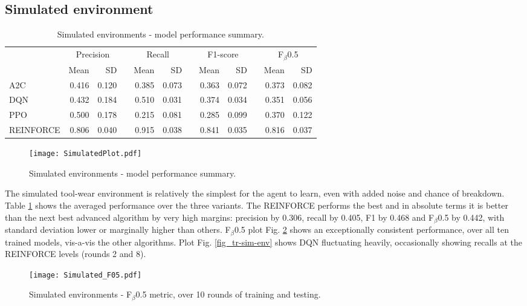 \documentclass[referee, sn-mathphys-num]{sn-jnl}
\newcommand{\rowspace}[1]{\renewcommand{\arraystretch}{#1}}
\begin{document}
	\subsection{Simulated environment}
	\begin{table}
		\rowspace{1.3}
		\caption{Simulated environments - model performance summary.}
		{\begin{tabular}{@{}l rr c rr c rr c rr@{}}
				\arrayrulecolor{black!40}\toprule
				& \multicolumn{2}{c}{Precision} & \phantom{i} & \multicolumn{2}{c}{Recall} & \phantom{i} & \multicolumn{2}{c}{F1-score} & \phantom{i} & \multicolumn{2}{c}{F$_\beta$0.5} \\
				\cmidrule{2-3} \cmidrule{5-6} \cmidrule{8-9} \cmidrule{11-12} 
				
				&Mean &SD & &Mean &SD & &Mean &SD& &Mean & SD\\ \midrule
				A2C & 0.416 & 0.120 & &0.385 & 0.073 & & 0.363 & 0.072 & &0.373 &0.082 \\
				DQN & 0.432 & 0.184 & &0.510 & 0.031 & & 0.374 & 0.034 & &0.351 &0.056 \\
				PPO & 0.500 & 0.178 & &0.215 & 0.081 & & 0.285 & 0.099 & &0.370 &0.122 \\
				REINFORCE & \textcolor{dblue}{0.806} & 0.040 & &\textcolor{dblue}{0.915} & 0.038 & & \textcolor{dblue}{0.841} & 0.035 & &\textcolor{dblue}{0.816} &0.037 \\
				\bottomrule
		\end{tabular}}
		\label{tbl_SimulatedEnv}
	\end{table}
	\begin{figure}[hbt!]
		\centering
		\texttt{[image: SimulatedPlot.pdf]}  
		\caption{Simulated environments - model performance summary.}
		\label{fig_SimulatedEnv}
	\end{figure}
	The simulated tool-wear environment is relatively the simplest for the agent to learn, even with added noise and chance of breakdown. Table \ref{tbl_SimulatedEnv} shows the averaged performance over the three variants. The REINFORCE performs the best and in absolute terms it is better than the next best advanced algorithm by very high margins: precision by 0.306, recall by 0.405, F1 by 0.468 and F$_\beta$0.5 by 0.442, with standard deviation lower or marginally higher than others. F$_\beta$0.5 plot Fig. \ref{fig_FbetaSimulated} shows an exceptionally consistent performance, over all ten trained models, vis-a-vis the other algorithms. Plot Fig. \ref{fig_tr-sim-env} shows DQN fluctuating heavily, occasionally showing recalls at the REINFORCE levels (rounds 2 and 8).
	\begin{figure}[hbt!]
		\centering
		\texttt{[image: Simulated\_F05.pdf]}  
		\caption{Simulated environments - F$_\beta$0.5 metric, over 10 rounds of training and testing.}
		\label{fig_FbetaSimulated}
	\end{figure}
	
\end{document}
